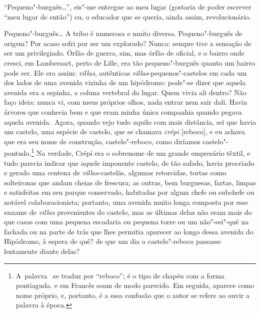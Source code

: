 ``Pequeno"-burguês\ldots{}'', eis"-me entregue ao meu lugar (gostaria de poder
escrever ``meu lugar de então'') eu, o educador que se queria, ainda
assim, revolucionário.

Pequeno"-burguês\ldots{} A tribo é numerosa e muito diversa. Pequeno"-burguês
de origem? Por acaso sofri por ser um explorado? Nunca: sempre tive a
sensação de ser um privilegiado. Órfão de guerra, sim, mas órfão de
oficial, e o bairro onde cresci, em Lambersart, perto de Lille, era tão
pequeno"-burguês quanto um bairro pode ser. Ele era assim: \emph{villas},
autênticas \emph{villas}-pequenos"-castelos em cada um dos lados de uma
avenida vizinha de um hipódromo: pode"-se dizer que aquela avenida era a
espinha, a coluna vertebral do lugar. Quem vivia ali dentro? Não faço
ideia: nunca vi, com meus próprios olhos, nada entrar nem sair dali.
Havia árvores que conhecia bem e que eram minha única companhia quando
pegava aquela avenida.~Agora, quando vejo tudo aquilo com mais
distância, sei que havia um castelo, uma espécie de castelo, que se
chamava \emph{crépi} {[}reboco{]}, e eu achava que era seu nome de
construção, castelo"-reboco, como diríamos castelo"-pontudo.\footnote{A~palavra~{} se traduz por ``reboco''; {} é
o tipo de chapéu com a forma pontiaguda. {} e
{} em Francês soam de modo parecido. Em seguida,
{} aparece como nome próprio, e, portanto, é a essa confusão
que o autor se refere ao ouvir a palavra à época.} Na verdade, Crépi
era o sobrenome de um grande empresário têxtil, e tudo parecia indicar
que aquele imponente castelo, de tão safado, havia procriado e gerado
uma centena de \emph{villas}-castelãs, algumas retorcidas, tortas como
solteironas que andam cheias de frescura; as outras, bem burguesas,
fartas, limpas e satisfeitas em seu parque conservado, habitadas por
algum chefe ou subchefe ou notável colaboracionista; portanto, uma avenida
muito longa composta por esse enxame de \emph{villas} provenientes do
castelo, mas as últimas delas não eram mais do que casas com uma pequena
escadaria ou pequena torre ou um não"-sei"-quê na fachada ou na parte de
trás que lhes permitia aparecer ao longo dessa avenida do Hipódromo, à
espera de quê? de que um dia o castelo"-reboco passasse lentamente diante
delas?

